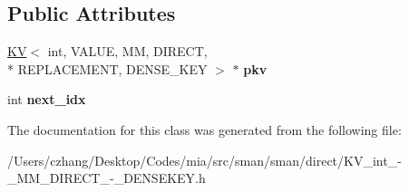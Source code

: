 \subsection*{Public Attributes}
\begin{DoxyCompactItemize}
\item 
\hypertarget{classmia_1_1sm_1_1_k_v_3_01int_00_01_v_a_l_u_e_00_01_m_m_00_01_d_i_r_e_c_t_00_01_r_e_p_l_a_c_e_m00136a9f08c6f99ce3723959776b6b87_ae20595dbc2af7e8a85e5860a33147212}{\hyperlink{classmia_1_1sm_1_1_k_v}{K\-V}$<$ int, V\-A\-L\-U\-E, M\-M, D\-I\-R\-E\-C\-T, \\*
R\-E\-P\-L\-A\-C\-E\-M\-E\-N\-T, D\-E\-N\-S\-E\-\_\-\-K\-E\-Y $>$ $\ast$ {\bfseries pkv}}\label{classmia_1_1sm_1_1_k_v_3_01int_00_01_v_a_l_u_e_00_01_m_m_00_01_d_i_r_e_c_t_00_01_r_e_p_l_a_c_e_m00136a9f08c6f99ce3723959776b6b87_ae20595dbc2af7e8a85e5860a33147212}

\item 
\hypertarget{classmia_1_1sm_1_1_k_v_3_01int_00_01_v_a_l_u_e_00_01_m_m_00_01_d_i_r_e_c_t_00_01_r_e_p_l_a_c_e_m00136a9f08c6f99ce3723959776b6b87_afa62a8364da7b623cb280c9ee9c77bef}{int {\bfseries next\-\_\-idx}}\label{classmia_1_1sm_1_1_k_v_3_01int_00_01_v_a_l_u_e_00_01_m_m_00_01_d_i_r_e_c_t_00_01_r_e_p_l_a_c_e_m00136a9f08c6f99ce3723959776b6b87_afa62a8364da7b623cb280c9ee9c77bef}

\end{DoxyCompactItemize}


The documentation for this class was generated from the following file\-:\begin{DoxyCompactItemize}
\item 
/\-Users/czhang/\-Desktop/\-Codes/mia/src/sman/sman/direct/K\-V\-\_\-int\-\_\--\/\-\_\-\-M\-M\-\_\-\-D\-I\-R\-E\-C\-T\-\_\--\/\-\_\-\-D\-E\-N\-S\-E\-K\-E\-Y.\-h\end{DoxyCompactItemize}
